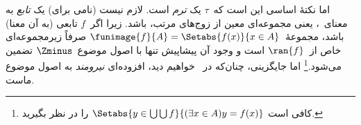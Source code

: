 \documentclass[../../../include/open-logic-section]{subfiles}
\begin{document}
اما نکتهٔ اساسی این است که~$\tau$ یک \emph{ترم} است. لازم نیست
(نامی برای) یک \emph{تابع} به معنای~، یعنی
مجموعه‌ای معین از زوج‌های مرتب، باشد. زیرا اگر~$f$ تابعی (به آن معنا)
باشد، مجموعهٔ~$\funimage{f}{A}=\Setabs{f(x)}{x \in A}$ صرفاً زیرمجموعه‌ای
خاص از~$\ran{f}$ است و وجود آن پیشاپیش تنها با اصول موضوع~$\Zminus$
تضمین می‌شود.\footnote{کافی است
$\Setabs{y \in \bigcup \bigcup f}{(\exists x \in A)y=f(x)}$ را در نظر
بگیرید.} اما جایگزینی، چنان‌که در~
خواهیم دید، افزوده‌ای \emph{نیرومند} به اصول موضوع ماست.
\end{document}
